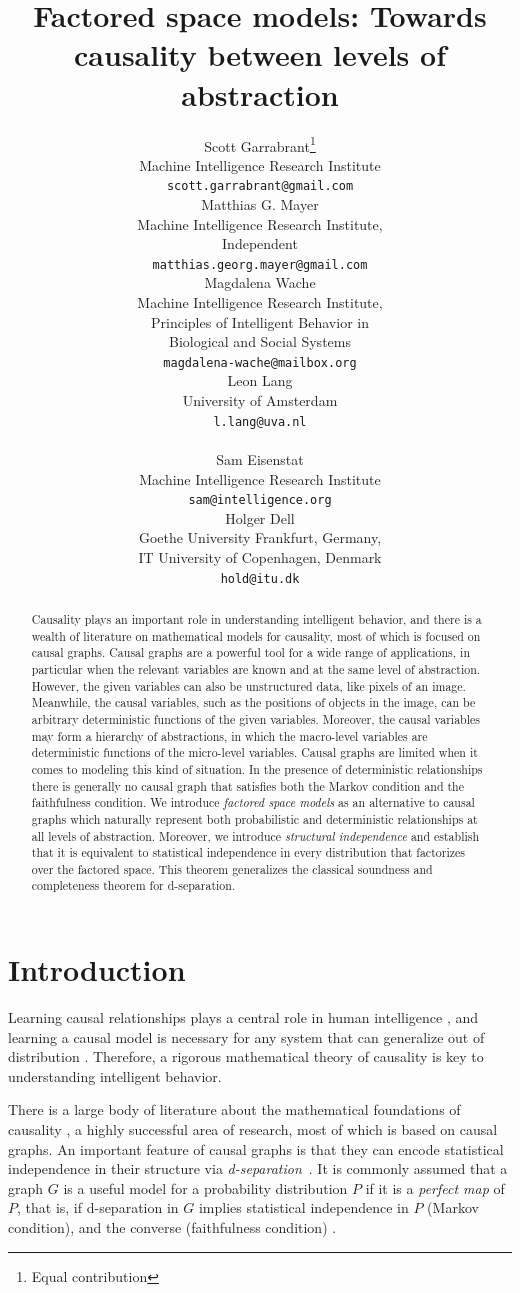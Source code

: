 \documentclass[USenglish,onecolumn]{article}
\author{
  Scott Garrabrant\thanks{Equal contribution}\\
  Machine Intelligence Research Institute \\
  \texttt{scott.garrabrant@gmail.com}\\
   \And
  Matthias G. Mayer\footnotemark[1] \\
  Machine Intelligence Research Institute, \\
  Independent \\
  \texttt{matthias.georg.mayer@gmail.com}\\
   \And
  Magdalena Wache\footnotemark[1] \\
  Machine Intelligence Research Institute, \\
  Principles of Intelligent Behavior in \\
  Biological and Social Systems\\
  \texttt{magdalena-wache@mailbox.org}\\
  \And
  Leon Lang \\
  University of Amsterdam\\
  \texttt{l.lang@uva.nl}\\
  \qquad\qquad\qquad\qquad\qquad\qquad\qquad\\
   \And
  Sam Eisenstat \\
  Machine Intelligence Research Institute\\
  \texttt{sam@intelligence.org}\\
   \And
  Holger Dell \\
  Goethe University Frankfurt, Germany, \\
  IT University of Copenhagen, Denmark \\
  \texttt{hold@itu.dk} \\
}
\title{Factored space models: Towards causality between levels of abstraction}
\begin{document}
\maketitle
\begin{abstract}
{Causality plays an important role in understanding intelligent behavior, and there is a wealth of literature on mathematical models for causality, most of which is focused on causal graphs. Causal graphs are a powerful tool for a wide range of applications, in particular when the relevant variables are known and at the same level of abstraction.
However, the given variables can also be unstructured data, like pixels of an image. Meanwhile, the causal variables, such as the positions of objects in the image, can be arbitrary deterministic functions of the given variables. Moreover, the causal variables may form a hierarchy of abstractions, in which the macro-level variables are deterministic functions of the micro-level variables.
Causal graphs are limited when it comes to modeling this kind of situation.
In the presence of deterministic relationships there is generally
no causal graph that satisfies both the Markov condition and the faithfulness condition.
We introduce \emph{factored space models} as an alternative to causal graphs which naturally represent both probabilistic and deterministic relationships at all levels of abstraction.
Moreover, we introduce \emph{structural independence} and establish that it is equivalent to statistical independence in every distribution that factorizes over the factored space. This theorem generalizes the classical soundness and completeness theorem for d-separation.
}
\end{abstract}

\allowdisplaybreaks
\section{Introduction}

Learning causal relationships plays a central role in human intelligence \cite{sloman2015causality} \cite{gopnik2012reconstructing}, and learning a causal model is necessary for any system that can generalize out of distribution \cite{richens2024robust}. %
Therefore, a rigorous mathematical theory of causality is key to understanding intelligent behavior.

There is a large body of literature about the mathematical foundations of causality \cite{pearl2009causality}, a highly successful area of research, most of which is based on causal graphs.
An important feature of causal graphs is that they can encode statistical independence in their structure via \emph{d-separation}~\cite{koller2009probabilistic}. It is commonly assumed that a graph $G$ is a useful model for a probability distribution $P$ if it is a \emph{perfect map}  of $P$, that is, if d-separation in $G$ implies statistical independence in $P$ (Markov condition), and the converse (faithfulness condition) \cite{spirtes2001causation}.
\end{document}
